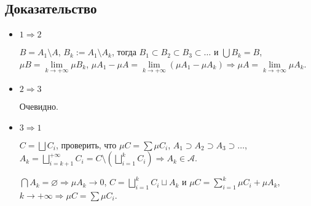 \documentclass{article}
\begin{document}
        \subsection{Доказательство}
        
            \begin{itemize}
            
                \item $1 \Rightarrow 2$
                
                    $B = A_1 \setminus A$, $B_k := A_1 \setminus A_k$, тогда $B_1 \subset B_2 \subset B_3 \subset \ldots$ и $\bigcup B_k = B$, $\mu B = \lim\limits_{k \rightarrow +\infty} \mu B_k$, $\mu A_1 - \mu A = \lim\limits_{k \rightarrow +\infty} \left( \mu A_1 - \mu A_k \right) \Rightarrow \mu A = \lim\limits_{k \rightarrow +\infty} \mu A_k$.
                    
                \item $2 \Rightarrow 3$
                
                    Очевидно.
                    
                \item $3 \Rightarrow 1$
                
                    $C = \bigsqcup C_i$, проверить, что $\mu C = \sum \mu C_i$, $A_1 \supset A_2 \supset A_3 \supset \ldots$, $A_k = \bigsqcup\limits^{+\infty}_{i = k + 1} C_i = C \setminus \left( \bigsqcup\limits^k_{i = 1} C_i \right) \Rightarrow A_k \in \mathcal{A}$.
                    
                    $\bigcap A_k = \varnothing \Rightarrow \mu A_k \rightarrow 0$, $C = \bigsqcup\limits^k_{i = 1} C_i \sqcup A_k$ и $\mu C = \sum\limits^k_{i = 1} \mu C_i + \mu A_k$, $k \rightarrow +\infty \Rightarrow \mu C = \sum \mu C_i$.
                    
            \end{itemize}
            
\end{document}
